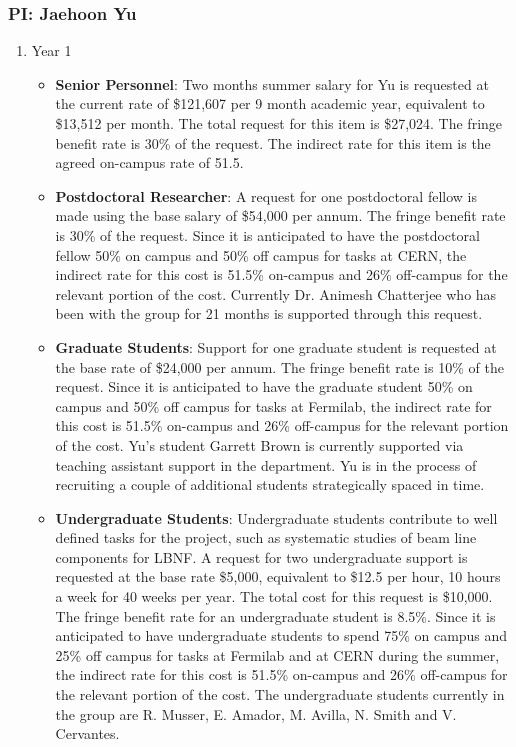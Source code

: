 \subsubsection{\bf PI: Jaehoon Yu}

\begin{enumerate}

\item{Year 1}
\begin{itemize}[noitemsep,nolistsep]
\item{{\bf Senior Personnel}: Two months summer salary for Yu is requested at the current rate of \$121,607 per 9 month academic year, equivalent to \$13,512 per month.  The total request for this item is \$27,024. The fringe benefit rate is 30\% of the request.  The indirect rate for this item is the agreed on-campus rate of 51.5.}

\item {{\bf Postdoctoral Researcher}: A request for one postdoctoral fellow is made using the base salary of \$54,000 per annum.  The fringe benefit rate is 30\% of the request.  Since it is anticipated to have the postdoctoral fellow 50\% on campus and 50\% off campus for tasks at CERN, the indirect rate for this cost is 51.5\% on-campus and 26\% off-campus for the relevant portion of the cost.  Currently Dr. Animesh Chatterjee who has been with the group for 21 months is supported through this request.} 

\item{{\bf Graduate Students}: Support for one graduate student is requested at the base rate of \$24,000 per annum.   The fringe benefit rate is 10\% of the request.  Since it is anticipated to have the graduate student 50\% on campus and 50\% off campus for tasks at Fermilab, the indirect rate for this cost is 51.5\% on-campus and 26\% off-campus for the relevant portion of the cost.   Yu’s student Garrett Brown is currently supported via teaching assistant support in the department.   Yu is in the process of recruiting a couple of additional students strategically spaced in time. }

\item {{\bf Undergraduate Students}: Undergraduate students contribute to well defined tasks for the project, such as systematic studies of beam line components for LBNF.  A request for two undergraduate support is requested at the base rate \$5,000, equivalent to \$12.5 per hour, 10 hours a week for 40 weeks per year.  The total cost for this request is \$10,000.  The fringe benefit rate for an undergraduate student is 8.5\%.  Since it is anticipated to have undergraduate students to spend 75\% on campus and 25\% off campus for tasks at Fermilab and at CERN during the summer, the indirect rate for this cost is 51.5\% on-campus and 26\% off-campus for the relevant portion of the cost.   The undergraduate students currently in the group are R. Musser,  E. Amador, M. Avilla, N. Smith and V. Cervantes.}


\end{itemize}
\end{enumerate}
